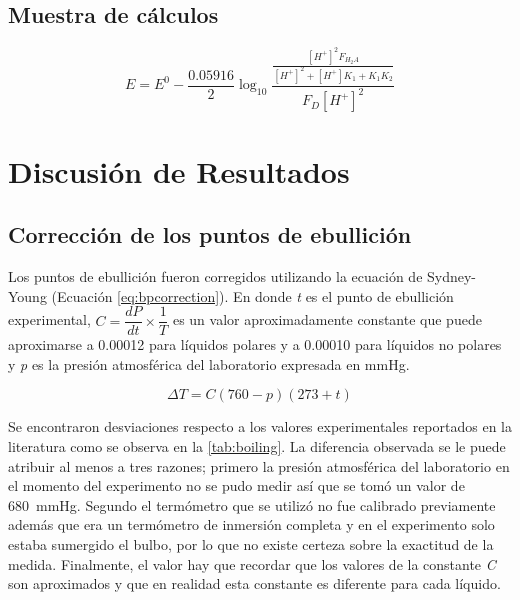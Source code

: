 \documentclass[12pt,letterpaper]{article}
\begin{document}
\subsection{Muestra de cálculos}

\begin{equation}
E={ E }^{ 0 }-\frac { 0.05916 }{ 2 } \log _{ 10 }{ \frac { \frac { { \left[ { H }^{ + } \right]  }^{ 2 }{ F }_{ { H }_{ 2 }A } }{ { \left[ { H }^{ + } \right]  }^{ 2 }+{ \left[ { H }^{ + } \right]  }{ K }_{ 1 }+{ K }_{ 1 }{ K }_{ 2 } }  }{ { F }_{ D }{ \left[ { H }^{ + } \right]  }^{ 2 } }  } 
\end{equation}

\section{Discusión de Resultados\label{sec:discusion}}

\subsection{Corrección de los puntos de ebullición}

Los puntos de ebullición fueron corregidos utilizando la ecuación de Sydney-Young\autocite{young:1902} (Ecuación \ref{eq:bpcorrection}). En donde \textit{t} es el punto de ebullición experimental, $C = \dfrac{dP}{dt} \times \dfrac{1}{T}$ es un valor aproximadamente constante que puede aproximarse a \num{0.00012} para líquidos polares y a \num{0.00010} para líquidos no polares y \textit{p} es la presión atmosférica del laboratorio expresada en mmHg.

\begin{equation}
\label{eq:bpcorrection}
\Delta T = C(760 - p)(273 + t)
\end{equation}

Se encontraron desviaciones respecto a los valores experimentales reportados en la literatura como se observa en la \ref{tab:boiling}. La diferencia observada se le puede atribuir al menos a tres razones; primero la presión atmosférica del laboratorio en el momento del experimento no se pudo medir así que se tomó un valor de \SI{680}{\mmHg}. Segundo el termómetro que se utilizó no fue calibrado previamente además que era un termómetro de inmersión completa y en el experimento solo estaba sumergido el bulbo, por lo que no existe certeza sobre la exactitud de la medida. Finalmente, el valor hay que recordar que los valores de la constante \textit{C} son aproximados y que en realidad esta constante es diferente para cada líquido.
\end{document}
